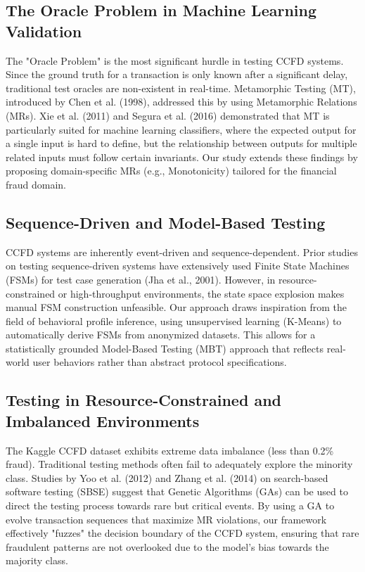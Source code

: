 \documentclass[review]{elsarticle}
\begin{document}
\subsection{The Oracle Problem in Machine Learning Validation}
The "Oracle Problem" is the most significant hurdle in testing CCFD systems. Since the ground truth for a transaction is only known after a significant delay, traditional test oracles are non-existent in real-time. Metamorphic Testing (MT), introduced by Chen et al. (1998), addressed this by using Metamorphic Relations (MRs). Xie et al. (2011) and Segura et al. (2016) demonstrated that MT is particularly suited for machine learning classifiers, where the expected output for a single input is hard to define, but the relationship between outputs for multiple related inputs must follow certain invariants. Our study extends these findings by proposing domain-specific MRs (e.g., Monotonicity) tailored for the financial fraud domain.

\subsection{Sequence-Driven and Model-Based Testing}
CCFD systems are inherently event-driven and sequence-dependent. Prior studies on testing sequence-driven systems have extensively used Finite State Machines (FSMs) for test case generation (Jha et al., 2001). However, in resource-constrained or high-throughput environments, the state space explosion makes manual FSM construction unfeasible. Our approach draws inspiration from the field of behavioral profile inference, using unsupervised learning (K-Means) to automatically derive FSMs from anonymized datasets. This allows for a statistically grounded Model-Based Testing (MBT) approach that reflects real-world user behaviors rather than abstract protocol specifications.

\subsection{Testing in Resource-Constrained and Imbalanced Environments}
The Kaggle CCFD dataset exhibits extreme data imbalance (less than 0.2\% fraud). Traditional testing methods often fail to adequately explore the minority class. Studies by Yoo et al. (2012) and Zhang et al. (2014) on search-based software testing (SBSE) suggest that Genetic Algorithms (GAs) can be used to direct the testing process towards rare but critical events. By using a GA to evolve transaction sequences that maximize MR violations, our framework effectively "fuzzes" the decision boundary of the CCFD system, ensuring that rare fraudulent patterns are not overlooked due to the model's bias towards the majority class.
\end{document}

